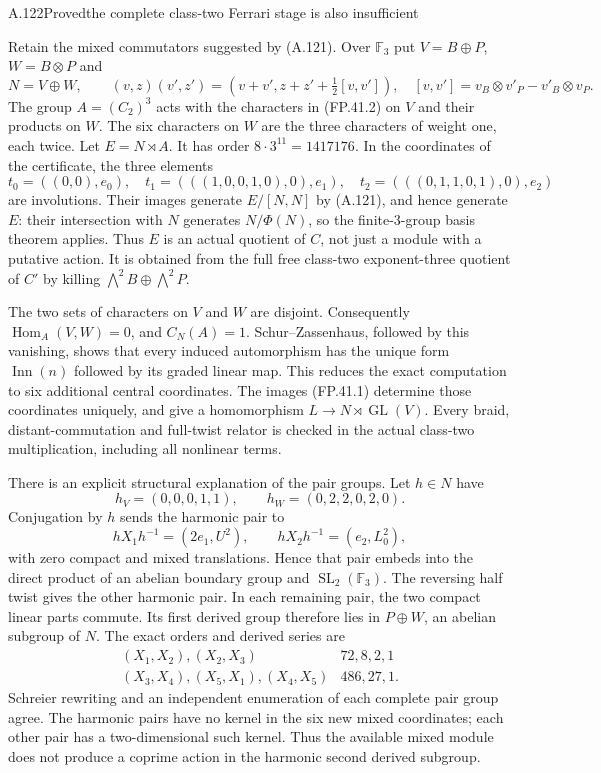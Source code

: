 \begin{statement}{A.122}{Proved}{the complete class-two Ferrari stage is also insufficient}
\end{statement}
Retain the mixed commutators suggested by (A.121). Over
$\mathbb F_3$ put $V=B\oplus P$, $W=B\otimes P$ and
\[
 N=V\oplus W,\qquad
 (v,z)(v',z')=(v+v',z+z'+\tfrac12[v,v']),
 \quad
 [v,v']=v_B\otimes v'_P-v'_B\otimes v_P.
 \tag{FP.42.1}
\]
The group $A=(C_2)^3$ acts with the characters in (FP.41.2)
on $V$ and their products on $W$. The six characters on $W$
are the three characters of weight one, each twice. Let
$E=N\rtimes A$. It has order $8\cdot3^{11}=1417176$.
In the coordinates of the certificate, the three elements
\[
 t_0=((0,0),e_0),\quad
 t_1=(((1,0,0,1,0),0),e_1),\quad
 t_2=(((0,1,1,0,1),0),e_2)
\]
are involutions. Their images generate $E/[N,N]$ by (A.121),
and hence generate $E$: their intersection with $N$ generates
$N/\Phi(N)$, so the finite-$3$-group basis theorem applies.
Thus $E$ is an actual quotient of $C$, not just a module
with a putative action. It is obtained from the full free
class-two exponent-three quotient of $C'$ by killing
$\bigwedge^2B\oplus\bigwedge^2P$.

The two sets of characters on $V$ and $W$ are disjoint.
Consequently $\operatorname{Hom}_A(V,W)=0$, and
$C_N(A)=1$. Schur--Zassenhaus, followed by this vanishing,
shows that every induced automorphism has the unique form
$\operatorname{Inn}(n)$ followed by its graded linear map.
This reduces the exact computation to six additional central
coordinates. The images (FP.41.1) determine those coordinates
uniquely, and give a homomorphism
$L\to N\rtimes\operatorname{GL}(V)$. Every braid,
distant-commutation and full-twist relator is checked in the
actual class-two multiplication, including all nonlinear terms.

There is an explicit structural explanation of the pair groups.
Let $h\in N$ have
\[
 h_V=(0,0,0,1,1),\qquad
 h_W=(0,2,2,0,2,0).
\]
Conjugation by $h$ sends the harmonic pair to
\[
 hX_1h^{-1}=(2e_1,U^2),\qquad
 hX_2h^{-1}=(e_2,L_0^2),
 \tag{FP.42.2}
\]
with zero compact and mixed translations. Hence that pair
embeds into the direct product of an abelian boundary group
and $\operatorname{SL}_2(\mathbb F_3)$. The reversing half
twist gives the other harmonic pair. In each remaining pair,
the two compact linear parts commute. Its first derived group
therefore lies in $P\oplus W$, an abelian subgroup of $N$.
The exact orders and derived series are
\[
\begin{array}{c|c}
 (X_1,X_2),(X_2,X_3)&72,8,2,1\\
 (X_3,X_4),(X_5,X_1),(X_4,X_5)&486,27,1.
\end{array}
 \tag{FP.42.3}
\]
Schreier rewriting and an independent enumeration of each
complete pair group agree. The harmonic pairs have no kernel
in the six new mixed coordinates; each other pair has a
two-dimensional such kernel. Thus the available mixed module
does not produce a coprime action in the harmonic second
derived subgroup.

